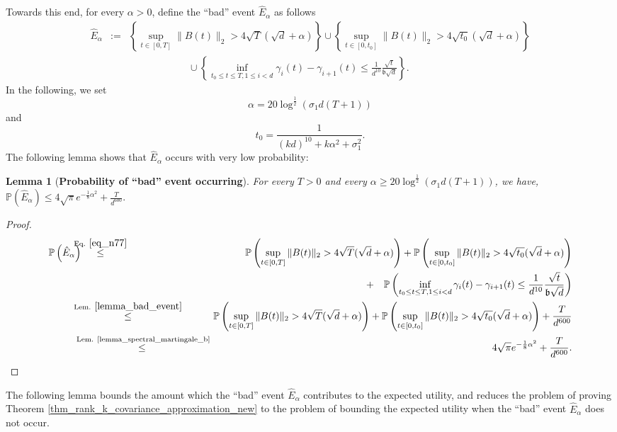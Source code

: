 \documentclass[11pt,letterpaper]{article}
\newtheorem{lemma}[theorem]{Lemma}
\begin{document}
Towards this end, for every $\alpha>0$, define the ``bad'' event $\hat{E}_\alpha$ as follows 
\begin{eqnarray}\label{eq_n77}
\hat{E}_\alpha &:=& \left\{\sup_{t \in [0,T]}\|B(t)\|_2 > 4\sqrt{T}(\sqrt{d} + \alpha) \right\} \cup \left\{\sup_{t \in [0,t_0]}\|B(t)\|_2 > 4\sqrt{t_0}(\sqrt{d} + \alpha) \right\} \nonumber\\
%
& & \qquad \qquad \qquad \cup \left\{\inf_{t_0 \leq t \leq T, 1\leq i < d  }\gamma_i(t) - \gamma_{i+1}(t) \leq \frac{1}{d^{10}} \frac{\sqrt{t}}{\mathfrak{b}\sqrt{d}} \right\}. 
\end{eqnarray}
%
In the following, we set 
%
\begin{equation}\label{eq_alpha}
\alpha = 20\log^{\frac{1}{2}}(\sigma_1 d (T+1))
\end{equation}
and
\begin{equation}\label{eq_t0}
 t_0 = \frac{1}{(kd)^{10} + k\alpha^2 +\sigma_1^2}.
 \end{equation}
%
The following lemma shows that  $\hat{E}_\alpha$ occurs with very low probability:
%
\begin{lemma}[\bf Probability of ``bad'' event occurring] \label{lemma_spectral_martingale}
 For every $T>0$ and every $\alpha \geq 20\log^{\frac{1}{2}}(\sigma_1 d (T+1))$, we have,
      $ \mathbb{P}\left(\hat{E}_\alpha\right) \leq 4\sqrt{\pi} e^{-\frac{1}{8}\alpha^2}  + \frac{T}{d^{600}}.$
\end{lemma}
%
%
\begin{proof}
\begin{eqnarray*}
    \mathbb{P}\left(\hat{E}_\alpha\right) \!\!\!\!\!\! &\stackrel{\textrm{Eq. } \eqref{eq_n77}}{\leq} & \!\!\!\! \mathbb{P}\left(\sup_{t \in [0,T]}\|B(t)\|_2 > 4\sqrt{T}(\sqrt{d} + \alpha)\right) +  \mathbb{P}\left(\sup_{t \in [0,t_0]}\|B(t)\|_2 > 4\sqrt{t_0}(\sqrt{d} + \alpha)\right)\\
    & & + \quad \mathbb{P}\left(\inf_{t_0 \leq t \leq T, 1\leq i < d  }\gamma_i(t) - \gamma_{i+1}(t) \leq \frac{1}{d^{10}} \frac{\sqrt{t}}{\mathfrak{b}\sqrt{d}}\right)\\
     &\stackrel{\textrm{Lem. } \ref{lemma_bad_event}}{\leq}  & \!\!\!\! \mathbb{P}\left(\sup_{t \in [0,T]}\|B(t)\|_2 > 4\sqrt{T}(\sqrt{d} + \alpha)\right) +  \mathbb{P}\left(\sup_{t \in [0,t_0]}\|B(t)\|_2 > 4\sqrt{t_0}(\sqrt{d} + \alpha)\right)  + \frac{T}{d^{600}}\\
    & \stackrel{\textrm{ Lem. \ref{lemma_spectral_martingale_b}}}{\leq} & 4\sqrt{\pi} e^{-\frac{1}{8}\alpha^2}  + \frac{T}{d^{600}}.
\end{eqnarray*}
\end{proof}
\noindent
The following lemma bounds the amount which the ``bad'' event $\hat{E}_\alpha$ contributes to the expected utility, and reduces the problem of proving Theorem \ref{thm_rank_k_covariance_approximation_new} to the problem of bounding the expected utility when the ``bad'' event $\hat{E}_\alpha$ does not occur.
%
\end{document}
